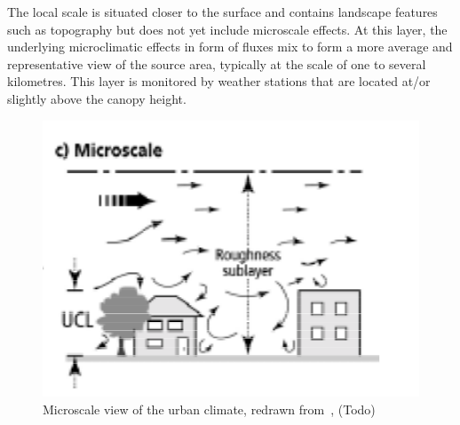The local scale is situated closer to the surface and contains landscape features such as topography but does not yet include microscale effects. At this layer, the underlying microclimatic effects in form of fluxes mix to form a more average and representative view of the source area, typically at the scale of one to several kilometres. This layer is monitored by weather stations that are located at/or slightly above the canopy height.

\begin{figure}[h]
    \centering
    \includegraphics[width=\textwidth]{images/microscale boundary layer.png}
    \caption{Microscale view of the urban climate, redrawn from~\cite{oke2006guideline}, (Todo)}
    \label{fig:microscale boundary layer}
\end{figure}

